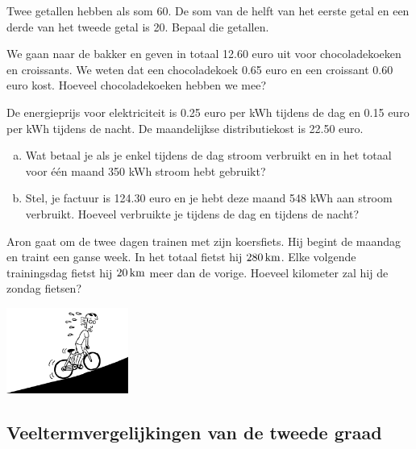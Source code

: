 \documentclass[12pt,twoside,a4paper]{article}
\begin{document}
\begin{oefening}
Twee getallen hebben als som 60. De som van de helft van het eerste getal en een derde van het tweede getal is 20. Bepaal die getallen.
\end{oefening}

\begin{oefening}
We gaan naar de bakker en geven in totaal 12.60 euro uit voor chocoladekoeken en croissants. We weten dat een chocoladekoek 0.65 euro en een croissant 0.60 euro kost. Hoeveel chocoladekoeken hebben we mee?
\end{oefening}

\begin{oefening}
De energieprijs voor elektriciteit is 0.25 euro per kWh tijdens de dag en 0.15 euro per kWh tijdens de nacht. De maandelijkse distributiekost is 22.50 euro.
\begin{enumerate}[(a)]
  \item Wat betaal je als je enkel tijdens de dag stroom verbruikt en in het totaal voor één maand 350 kWh stroom hebt gebruikt?
  \item Stel, je factuur is 124.30 euro en je hebt deze maand 548 kWh aan stroom verbruikt. Hoeveel verbruikte je tijdens de dag en tijdens de nacht?
\end{enumerate}
\end{oefening}

\begin{oefening}
Aron gaat om de twee dagen trainen met zijn koersfiets. Hij begint de maandag en traint een ganse week. In het totaal fietst hij $280 \km$. Elke volgende trainingsdag fietst hij $20 \km$ meer dan de vorige. Hoeveel kilometer zal hij de zondag fietsen?
\end{oefening}

\vfill\hfill\includegraphics[width=4cm]{fietser}

\subsection{Veeltermvergelijkingen van de tweede graad}
\end{document}
